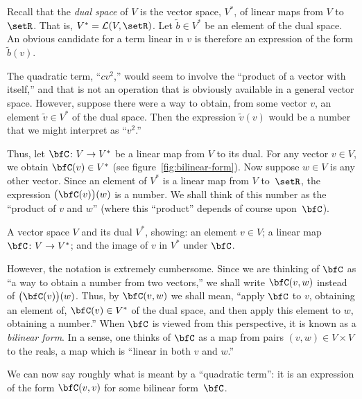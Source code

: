 \documentclass[10pt, a4paper]{article}
\begin{document}
Recall that the \emph{dual space} of $V$ is the vector space, $V^*$, of
linear maps from $V$ to~$\setR$. That is, $V^*=\mathcal{L}(V, \setR)$. Let
$\tilde{b}\in V^*$ be an element of the dual space. An obvious candidate
for a term linear in $v$ is therefore an expression of the form
$\tilde{b}(v)$.

The quadratic term, ``$cv^2$,'' would seem to involve the ``product of
a vector with itself,'' and that is not an operation that is obviously
available in a general vector space. However, suppose there were a way
to obtain, from some vector $v$, an element $\tilde{v}\in V^*$ of the
dual space. Then the expression $\tilde{v}(v)$ would be a number that
we might interpret as ``$v^2$.''

Thus, let $\bfC\colon V\to V^*$ be a linear map from $V$ to its
dual. For any vector $v\in V$, we obtain $\bfC(v)\in V^*$ (see
figure~\ref{fig:bilinear-form}). Now suppose $w\in V$ is any other
vector. Since an element of $V^*$ is a linear map from $V$ to~$\setR$,
the expression $\bigl(\bfC(v)\bigr)(w)$ is a number. We shall think of
this number as the ``product of $v$ and $w$'' (where this “product”
depends of course upon~$\bfC$).
\begin{marginfigure}
  \begin{center}
  \end{center}
  \caption{A vector space $V$ and its dual $V^*$, showing: an element
    $v\in V$; a linear map $\bfC\colon V\to V^*$; and the image of $v$ in
    $V^*$ under $\bfC$.\label{fig:bilinear-form}}
\end{marginfigure}

However, the notation is extremely cumbersome. Since we are thinking
of $\bfC$ as ``a way to obtain a number from two vectors,'' we shall
write $\bfC(v,w)$ instead of $\bigl(\bfC(v)\bigr)(w)$. Thus, by
$\bfC(v, w)$ we shall mean, ``apply $\bfC$ to $v$, obtaining an
element of, $\bfC(v)\in V^*$ of the dual space, and then apply this
element to $w$, obtaining a number.'' When $\bfC$ is viewed from this
perspective, it is known as a \emph{bilinear form}. In a sense, one
thinks of $\bfC$ as a map from pairs $(v,w)\in V\times V$ to the reals, a map
which is “linear in both $v$ and $w$.”

We can now say roughly what is meant by a “quadratic term”: it is an
expression of the form $\bfC(v,v)$ for some bilinear form~$\bfC$.
\end{document}
